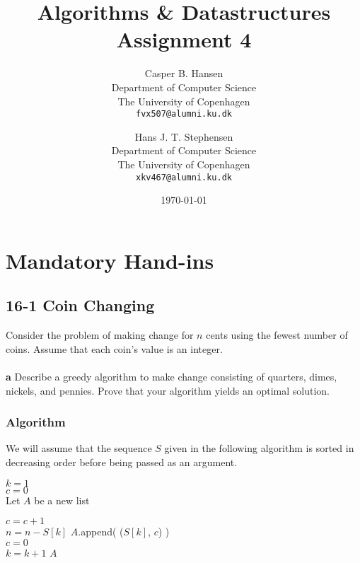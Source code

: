 \documentclass[11pt,english]{article}
\title
{
	\vspace{1in}
	Algorithms \& Datastructures\\
	\huge Assignment 4
}
\author
{
	Casper B. Hansen\\
	\small Department of Computer Science\\
	\small The University of Copenhagen\\
	\texttt{fvx507@alumni.ku.dk}
	\and
	Hans J. T. Stephensen\\
	\small Department of Computer Science\\
	\small The University of Copenhagen\\
	\texttt{xkv467@alumni.ku.dk}
}
\date{\today}
\begin{document}
\clearpage
\maketitle
\thispagestyle{empty}


\newpage
\pagestyle{fancy}

\section*{Mandatory Hand-ins}

\subsection*{16-1 Coin Changing}
\large{Consider the problem of making change for $n$ cents using the fewest
number of coins. Assume that each coin's value is an integer.}
\\\\
\noindent \large{\textbf{a} \mdseries Describe a greedy algorithm to make
change consisting of quarters, dimes, nickels, and pennies. Prove that your
algorithm yields an optimal solution.}

\subsubsection*{Algorithm}
\noindent We will assume that the sequence $S$ given in the following
algorithm is sorted in decreasing order before being passed as an argument.

\begin{algorithm}
	
	\BlankLine
	
	$k = 1$\\
	$c = 0$\\
	Let $A$ be a new list
	
	{
		{
			$c = c + 1$\\
			$n = n - S[k]$
		}
		{
			{
				$A$.append( ($S[k]$, $c$) )\\
			}
			$c = 0$\\
			$k = k + 1$
		}
	}
	\Return $A$
\end{algorithm}
\end{document}
